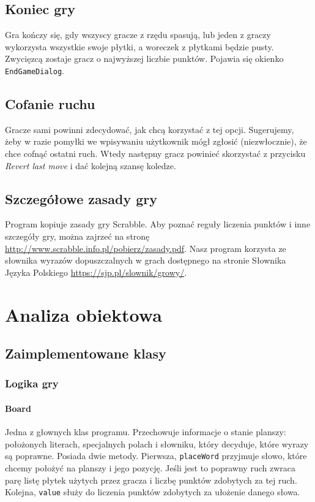 \documentclass[a4paper]{article}
\begin{document}
\subsection{Koniec gry}
Gra kończy się, gdy wszyscy gracze z rzędu spasują, lub jeden z graczy wykorzysta wszystkie swoje płytki, a woreczek z płytkami będzie pusty.
Zwycięzcą zostaje gracz o najwyższej liczbie punktów.
Pojawia się okienko \texttt{EndGameDialog}.
\subsection{Cofanie ruchu}
Gracze sami powinni zdecydować, jak chcą korzystać z tej opcji.
Sugerujemy, żeby w razie pomyłki we wpisywaniu użytkownik mógł zgłosić (niezwłocznie), że chce cofnąć ostatni ruch.
Wtedy następny gracz powinieć skorzystać z przycisku \textit{Revert last move} i dać kolejną szansę koledze.
\subsection{Szczegółowe zasady gry}
Program kopiuje zasady gry Scrabble.
Aby poznać reguły liczenia punktów i inne szczegóły gry, można zajrzeć na stronę \url{http://www.scrabble.info.pl/pobierz/zasady.pdf}.
Nasz program korzysta ze słownika wyrazów dopuszczalnych w grach dostępnego na stronie Słownika Języka Polskiego \url{https://sjp.pl/slownik/growy/}.
\section{Analiza obiektowa}
\subsection{Zaimplementowane klasy}
\subsubsection{Logika gry}
\paragraph{Board} Jedna z głownych klas programu. Przechowuje informacje o stanie planszy: położonych literach, specjalnych polach i słowniku, który decyduje, które wyrazy są poprawne. Posiada dwie metody. Pierwsza, \texttt{placeWord} przyjmuje słowo, które chcemy położyć na planszy i jego pozycję. Jeśli jest to poprawny ruch zwraca parę listę płytek użytych przez gracza i liczbę punktów zdobytych za tej ruch. Kolejna, \texttt{value} służy do liczenia punktów zdobytych za ułożenie danego słowa.
\end{document}
